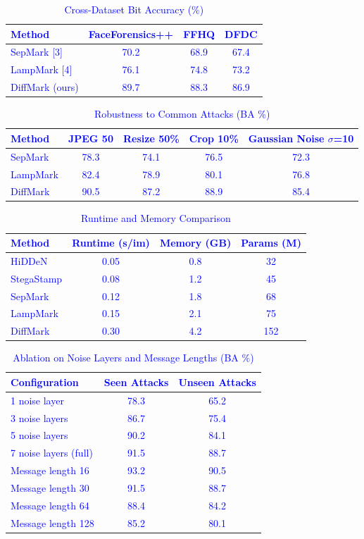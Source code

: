 \documentclass{article}
\begin{document}
\textcolor{blue}{
\begin{table}[h]
\centering
\caption{Cross-Dataset Bit Accuracy (\%)}
\begin{tabular}{lccc}
\toprule
Method & FaceForensics++ & FFHQ & DFDC \\
\midrule
SepMark [3] & 70.2 & 68.9 & 67.4 \\
LampMark [4] & 76.1 & 74.8 & 73.2 \\
DiffMark (ours) & 89.7 & 88.3 & 86.9 \\
\bottomrule
\end{tabular}
\end{table}

\begin{table}[h]
\centering
\caption{Robustness to Common Attacks (BA \%)}
\begin{tabular}{lcccc}
\toprule
Method & JPEG 50 & Resize 50\% & Crop 10\% & Gaussian Noise $\sigma$=10 \\
\midrule
SepMark & 78.3 & 74.1 & 76.5 & 72.3 \\
LampMark & 82.4 & 78.9 & 80.1 & 76.8 \\
DiffMark & 90.5 & 87.2 & 88.9 & 85.4 \\
\bottomrule
\end{tabular}
\end{table}

\begin{table}[h]
\centering
\caption{Runtime and Memory Comparison}
\begin{tabular}{lccc}
\toprule
Method & Runtime (s/im) & Memory (GB) & Params (M) \\
\midrule
HiDDeN & 0.05 & 0.8 & 32 \\
StegaStamp & 0.08 & 1.2 & 45 \\
SepMark & 0.12 & 1.8 & 68 \\
LampMark & 0.15 & 2.1 & 75 \\
DiffMark & 0.30 & 4.2 & 152 \\
\bottomrule
\end{tabular}
\end{table}

\begin{table}[h]
\centering
\caption{Ablation on Noise Layers and Message Lengths (BA \%)}
\begin{tabular}{lcc}
\toprule
Configuration & Seen Attacks & Unseen Attacks \\
\midrule
1 noise layer & 78.3 & 65.2 \\
3 noise layers & 86.7 & 75.4 \\
5 noise layers & 90.2 & 84.1 \\
7 noise layers (full) & 91.5 & 88.7 \\
\midrule
Message length 16 & 93.2 & 90.5 \\
Message length 30 & 91.5 & 88.7 \\
Message length 64 & 88.4 & 84.2 \\
Message length 128 & 85.2 & 80.1 \\
\bottomrule
\end{tabular}
\end{table}
}
\end{document}

